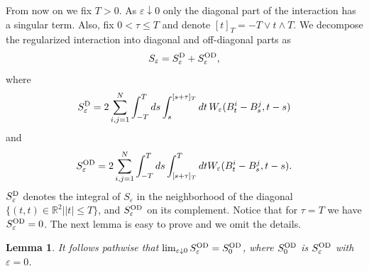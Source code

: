 \documentclass[11pt]{article}
\newtheorem{lemma}[theorem]{Lemma}
\newcommand{\bl}[1]{\begin{lemma}\label{#1}}
\newcommand{\el}{\end{lemma}}
\providecommand{\eq}[1]{\begin{equation}\label{#1}}
\providecommand{\en}{\end{equation}}
\providecommand{\iijj}{\sum_{i,j=1}^N}
\providecommand{\od}{{\rm OD}}
\providecommand{\dd}{{\rm D}}
\providecommand{\RR}{\mathbb{R}}
\providecommand{\1}{\mathbb{1}}
\providecommand{\dd}{\mathop{\mathrm{d}}\nolimits}
\providecommand{\eps}{\varepsilon}
\begin{document}
From now on we fix $T>0$. As $\eps\downarrow 0$ only the diagonal part of the interaction has a singular term.
Also, fix $0<\tau\leq T$ and denote $[t]_T = -T\vee t \wedge T$. We decompose the regularized interaction
into diagonal and off-diagonal parts as
\eq{hiror6}
S_\eps = S_\eps^{\dd } + S_\eps^{\od },
\en
where
\eq{eniwa1}
S_\eps^{\dd } = 2\iijj \int_{-T}^T ds \int_{s}^{[s+\tau]_T} dt\, W_\eps (B_t^i-B_s^j,t-s)
\en
and
\eq{eniwa2}
S_\eps^{\od }  = 2\iijj \int_{-T}^T ds \int_{[s+\tau]_T}^{T}dt W_\eps (B_t^i-B_s^j,t-s).
\en
$S_\eps^{\dd }$ denotes the integral of $S_\eps$ in the neighborhood of the diagonal
$\{(t,t)\in\RR^2| |t|\leq T\}$, and $S_\eps^{\od } $ on its complement. Notice that for $\tau=T$ we have
$S_\eps^{\od }=0$. The next lemma is easy to prove and we omit the details.
\bl{h1}
It follows pathwise that $\lim_{\eps\downarrow 0}S_\eps^{\od }  = S_0^{\od }$, where $S_0^{\od }$ is
$S_\eps^{\od }$ with $\eps=0$.
\el
\end{document}
